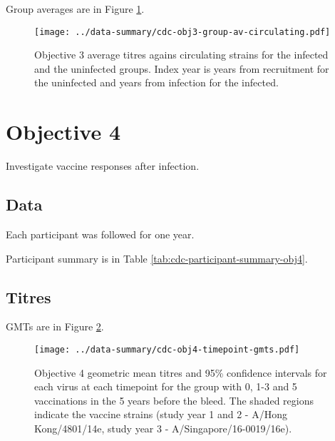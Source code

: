 \documentclass[12pt]{article}
\begin{document}
Group averages are in Figure \ref{fig:cdc-obj3-group-av-circulating}.

\begin{figure}
	\centering
	\texttt{[image: ../data-summary/cdc-obj3-group-av-circulating.pdf]}
	\caption{Objective 3 average titres agains circulating strains for the infected and the uninfected groups. Index year is years from recruitment for the uninfected and years from infection for the infected.}
	\label{fig:cdc-obj3-group-av-circulating}
\end{figure}

\section{Objective 4}

Investigate vaccine responses after infection.

\subsection{Data}

Each participant was followed for one year.

Participant summary is in Table \ref{tab:cdc-participant-summary-obj4}.



\subsection{Titres}

GMTs are in Figure \ref{fig:cdc-obj4-timepoint-gmts}.

\begin{figure}
	\texttt{[image: ../data-summary/cdc-obj4-timepoint-gmts.pdf]}
	\caption{Objective 4 geometric mean titres and 95\% confidence intervals for each virus at each timepoint for the group with 0, 1-3 and 5 vaccinations in the 5 years before the bleed. The shaded regions indicate the vaccine strains (study year 1 and 2 - A/Hong Kong/4801/14e, study year 3 - A/Singapore/16-0019/16e).}
	\label{fig:cdc-obj4-timepoint-gmts}
\end{figure}
\end{document}
